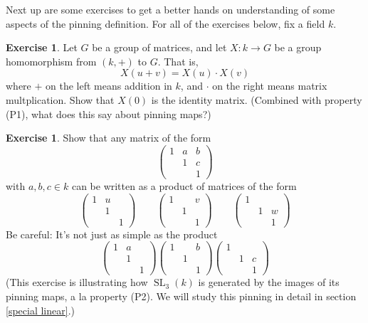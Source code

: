 \documentclass[12pt]{article}
\theoremstyle{definition}
\newtheorem{exercise}[theorem]{Exercise}
\numberwithin{theorem}{subsection}
\newcommand{\noi}{\noindent}
\DeclareMathOperator{\SL}{SL}
\begin{document}
\noi Next up are some exercises to get a better hands on understanding of some aspects of the pinning definition. For all of the exercises below, fix a field $k$.

\begin{exercise}
Let $G$ be a group of matrices, and let $X:k \to G$ be a group homomorphism from $(k, +)$ to $G$. That is,
\[
	X(u + v) = X(u) \cdot X(v)
\]
where $+$ on the left means addition in $k$, and $\cdot$ on the right means matrix multplication. Show that $X(0)$ is the identity matrix. (Combined with property (P1), what does this say about pinning maps?)
\end{exercise}

\begin{exercise}
Show that any matrix of the form
\[
	\begin{pmatrix}
		1 & a & b \\
		& 1 & c\\
		&& 1
	\end{pmatrix}
\]
with $a,b,c \in k$ can be written as a product of matrices of the form
\[
	\begin{pmatrix}
		1 & u &  \\
		& 1 & \\
		&& 1
	\end{pmatrix}
	\qquad
	\begin{pmatrix}
		1 & & v  \\
		& 1 & \\
		&& 1
	\end{pmatrix}
	\qquad
	\begin{pmatrix}
		1 & &  \\
		& 1 & w \\
		&& 1
	\end{pmatrix}
\]
Be careful: It's not just as simple as the product
\[
	\begin{pmatrix}
		1 & a &  \\
		& 1 & \\
		&& 1
	\end{pmatrix}
	\begin{pmatrix}
		1 & & b  \\
		& 1 & \\
		&& 1
	\end{pmatrix}
	\begin{pmatrix}
		1 & &  \\
		& 1 & c \\
		&& 1
	\end{pmatrix}
\]
(This exercise is illustrating how $\SL_3(k)$ is generated by the images of its pinning maps, a la property (P2). We will study this pinning in detail in section \ref{special linear}.)
\end{exercise}
\end{document}
